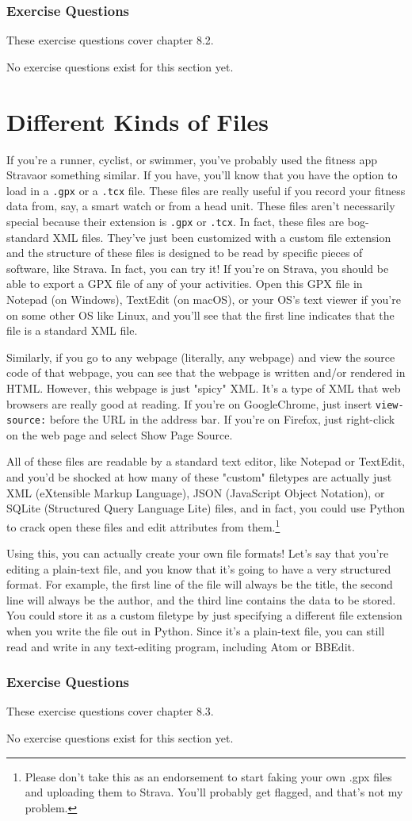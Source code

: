 \subsubsection*{Exercise Questions}
These exercise questions cover chapter 8.2.

No exercise questions exist for this section yet.
\section{Different Kinds of Files}
If you're a runner, cyclist, or swimmer, you've probably used the fitness app Strava\textregistered or something similar. If you have, you'll know that you have the option to load in a \verb|.gpx| or a \verb|.tcx| file. These files are really useful if you record your fitness data from, say, a smart watch or from a head unit. These files aren't necessarily special because their extension is \verb|.gpx| or \verb|.tcx|. In fact, these files are bog-standard XML files. They've just been customized with a custom file extension and the structure of these files is designed to be read by specific pieces of software, like Strava\textregistered. In fact, you can try it! If you're on Strava\textregistered, you should be able to export a GPX file of any of your activities. Open this GPX file in Notepad (on Windows), TextEdit (on macOS), or your OS's text viewer if you're on some other OS like Linux, and you'll see that the first line indicates that the file is a standard XML file.\par
Similarly, if you go to any webpage (literally, any webpage) and view the source code of that webpage, you can see that the webpage is written and/or rendered in HTML. However, this webpage is just "spicy" XML. It's a type of XML that web browsers are really good at reading. If you're on Google\textregistered Chrome\textregistered, just insert \verb|view-source:| before the URL in the address bar. If you're on Firefox, just right-click on the web page and select Show Page Source.\par
All of these files are readable by a standard text editor, like Notepad or TextEdit, and you'd be shocked at how many of these "custom" filetypes are actually just XML (eXtensible Markup Language), JSON (JavaScript Object Notation), or SQLite (Structured Query Language Lite) files, and in fact, you could use Python to crack open these files and edit attributes from them.\footnote{Please don't take this as an endorsement to start faking your own .gpx files and uploading them to Strava\textregistered. You'll probably get flagged, and that's not my problem.}\par
Using this, you can actually create your own file formats! Let's say that you're editing a plain-text file, and you know that it's going to have a very structured format. For example, the first line of the file will always be the title, the second line will always be the author, and the third line contains the data to be stored. You could store it as a custom filetype by just specifying a different file extension when you write the file out in Python. Since it's a plain-text file, you can still read and write in any text-editing program, including Atom or BBEdit\textregistered.\par
\subsubsection*{Exercise Questions}
These exercise questions cover chapter 8.3.

No exercise questions exist for this section yet.
